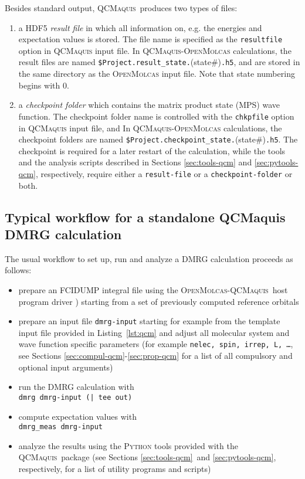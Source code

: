 \documentclass[bibliography=totoc,12pt,a4paper]{scrartcl}
\newcommand{\mol}{\textsc{OpenMolcas}}
\newcommand{\qcm}{\textsc{QCMaquis}}
\newcommand{\kwd}[1]{\texttt{#1}}
\begin{document}
Besides standard output, \qcm\ produces two types of files:
\begin{enumerate}
 \item a HDF5 \emph{result file} in which all information on, e.g. the energies and expectation values is stored. The file name is specified as the \kwd{resultfile} option in \qcm{} input file. In \qcm{}-\mol{} calculations, the result files are named \texttt{\$Project.result\_state.}(state\#)\texttt{.h5}, and are stored in the same directory as the \mol{} input file. Note that state numbering begins with 0.
 \item a \emph{checkpoint folder} which contains the matrix product state (MPS) wave function. The checkpoint folder name is controlled with the \kwd{chkpfile} option in \qcm{} input file, and In \qcm{}-\mol{} calculations, the checkpoint folders are named \texttt{\$Project.checkpoint\_state.}(state\#)\texttt{.h5}. The checkpoint is required for a later restart of the calculation, while the tools and the analysis scripts
described in Sections \ref{sec:tools-qcm} and \ref{sec:pytools-qcm}, respectively, require either a \texttt{result-file} or a
\texttt{checkpoint-folder} or both.
\end{enumerate}

\subsection{Typical workflow for a standalone QCMaquis DMRG calculation}
\label{sec:workflow-qcm}

The usual workflow to set up, run and analyze a DMRG calculation proceeds as follows:

\begin{itemize}
   \item prepare an FCIDUMP integral file using the \mol-\qcm\ host
   program driver \cite{interface}) starting from a set of previously computed reference orbitals
   \item prepare an input file \texttt{dmrg-input} starting for example from the template input file provided in Listing~\ref{lst:qcm} and adjust all molecular system and wave function specific parameters (for example \texttt{nelec, spin,
   irrep, L, \ldots}, see Sections \ref{sec:compul-qcm}-\ref{sec:prop-qcm} for a list of all compulsory and optional input arguments)
   \item run the DMRG calculation with\\
\texttt{dmrg dmrg-input (| tee out)}
   \item compute expectation values with\\
\texttt{dmrg\_meas dmrg-input}
   \item analyze the results using the \textsc{Python} tools provided with the \qcm\ package (see Sections \ref{sec:tools-qcm}\ and
   \ref{sec:pytools-qcm}, respectively, for a list of utility programs and scripts)
\end{itemize}
\end{document}

